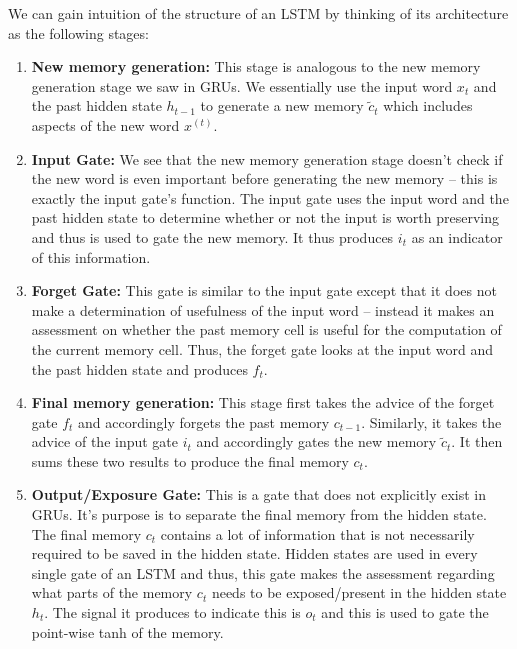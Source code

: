 \documentclass{tufte-handout}
\begin{document}
We can gain intuition of the structure of an LSTM by thinking of its architecture as the following stages:
\begin{enumerate}
\item \textbf{New memory generation:} This stage is analogous to the new memory generation stage we saw in GRUs. We essentially use the input word $x_{t}$ and the past hidden state $h_{t-1}$ to generate a new memory $\tilde{c}_{t}$ which includes aspects of the new word $x^{(t)}$.
\item \textbf{Input Gate:} We see that the new memory generation stage doesn't check if the new word is even important before generating the new memory -- this is exactly the input gate's function. The input gate uses the input word and the past hidden state to determine whether or not the input is worth preserving and thus is used to gate the new memory. It thus produces $i_{t}$ as an indicator of this information.
\item \textbf{Forget Gate:} This gate is similar to the input gate except that it does not make a determination of usefulness of the input word -- instead it makes an assessment on whether the past memory cell is useful for the computation of the current memory cell. Thus, the forget gate looks at the input word and the past hidden state and produces $f_{t}$.
\item \textbf{Final memory generation:} This stage first takes the advice of the forget gate $f_{t}$ and accordingly forgets the past memory $c_{t-1}$. Similarly, it takes the advice of the input gate $i_{t}$ and accordingly gates the new memory $\tilde{c}_{t}$. It then sums these two results to produce the final memory $c_{t}$.
\item \textbf{Output/Exposure Gate:} This is a gate that does not explicitly exist in GRUs. It's purpose is to separate the final memory from the hidden state. The final memory $c_{t}$ contains a lot of information that is not necessarily required to be saved in the hidden state. Hidden states are used in every single gate of an LSTM and thus, this gate makes the assessment regarding what parts of the memory $c_{t}$ needs to be exposed/present in the hidden state $h_{t}$. The signal it produces to indicate this is $o_{t}$ and this is used to gate the point-wise tanh of the memory.
\end{enumerate}
\end{document}
